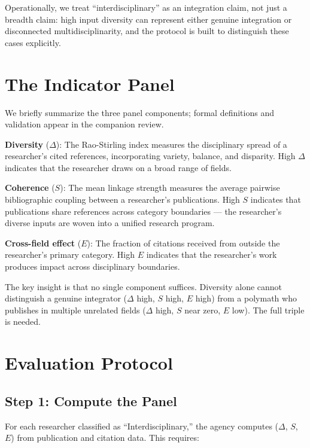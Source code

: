 \documentclass[
]{article}
\begin{document}
Operationally, we treat ``interdisciplinary'' as an integration claim,
not just a breadth claim: high input diversity can represent either
genuine integration or disconnected multidisciplinarity, and the
protocol is built to distinguish these cases explicitly.

\hypertarget{the-indicator-panel}{%
\section{The Indicator Panel}\label{the-indicator-panel}}

We briefly summarize the three panel components; formal definitions and
validation appear in the companion review.

\textbf{Diversity} (\(\Delta\)): The Rao-Stirling index measures the
disciplinary spread of a researcher's cited references, incorporating
variety, balance, and disparity. High \(\Delta\) indicates that the
researcher draws on a broad range of fields.

\textbf{Coherence} (\(S\)): The mean linkage strength measures the
average pairwise bibliographic coupling between a researcher's
publications. High \(S\) indicates that publications share references
across category boundaries --- the researcher's diverse inputs are woven
into a unified research program.

\textbf{Cross-field effect} (\(E\)): The fraction of citations received
from outside the researcher's primary category. High \(E\) indicates
that the researcher's work produces impact across disciplinary
boundaries.

The key insight is that no single component suffices. Diversity alone
cannot distinguish a genuine integrator (\(\Delta\) high, \(S\) high,
\(E\) high) from a polymath who publishes in multiple unrelated fields
(\(\Delta\) high, \(S\) near zero, \(E\) low). The full triple is
needed.

\hypertarget{evaluation-protocol}{%
\section{Evaluation Protocol}\label{evaluation-protocol}}

\hypertarget{step-1-compute-the-panel}{%
\subsection{Step 1: Compute the Panel}\label{step-1-compute-the-panel}}

For each researcher classified as ``Interdisciplinary,'' the agency
computes (\(\Delta\), \(S\), \(E\)) from publication and citation data.
This requires:
\end{document}
